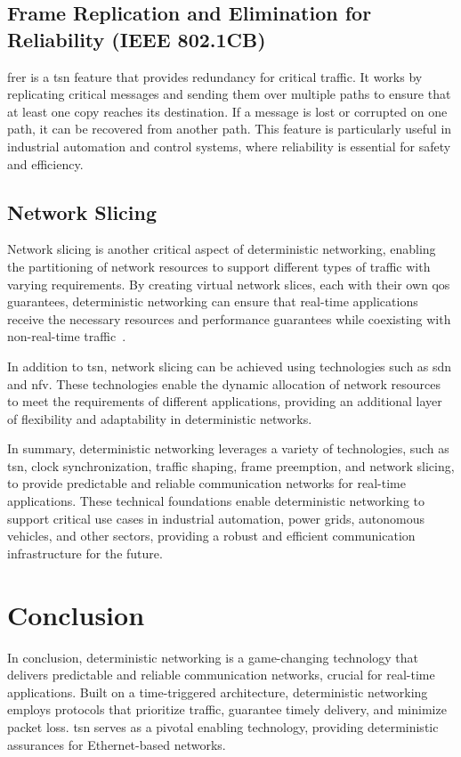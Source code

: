 \documentclass[runningheads]{llncs}
\begin{document}
\subsection*{Frame Replication and Elimination for Reliability (IEEE 802.1CB)}
\gls{frer} is a \gls{tsn} feature that provides redundancy for critical traffic. It works by replicating critical messages and sending them over multiple paths to ensure that at least one copy reaches its destination. If a message is lost or corrupted on one path, it can be recovered from another path. This feature is particularly useful in industrial automation and control systems, where reliability is essential for safety and efficiency.

\subsection*{Network Slicing}
Network slicing is another critical aspect of deterministic networking, enabling the partitioning of network resources to support different types of traffic with varying requirements. By creating virtual network slices, each with their own \gls{qos} guarantees, deterministic networking can ensure that real-time applications receive the necessary resources and performance guarantees while coexisting with non-real-time traffic~\cite{ietf-teas-ietf-network-slices-19}.

In addition to \gls{tsn}, network slicing can be achieved using technologies such as \gls{sdn} and \gls{nfv}. These technologies enable the dynamic allocation of network resources to meet the requirements of different applications, providing an additional layer of flexibility and adaptability in deterministic networks.

In summary, deterministic networking leverages a variety of technologies, such as \gls{tsn}, clock synchronization, traffic shaping, frame preemption, and network slicing, to provide predictable and reliable communication networks for real-time applications. These technical foundations enable deterministic networking to support critical use cases in industrial automation, power grids, autonomous vehicles, and other sectors, providing a robust and efficient communication infrastructure for the future.

\section{Conclusion}

In conclusion, deterministic networking is a game-changing technology that delivers predictable and reliable communication networks, crucial for real-time applications. Built on a time-triggered architecture, deterministic networking employs protocols that prioritize traffic, guarantee timely delivery, and minimize packet loss. \gls{tsn} serves as a pivotal enabling technology, providing deterministic assurances for Ethernet-based networks.
\end{document}
